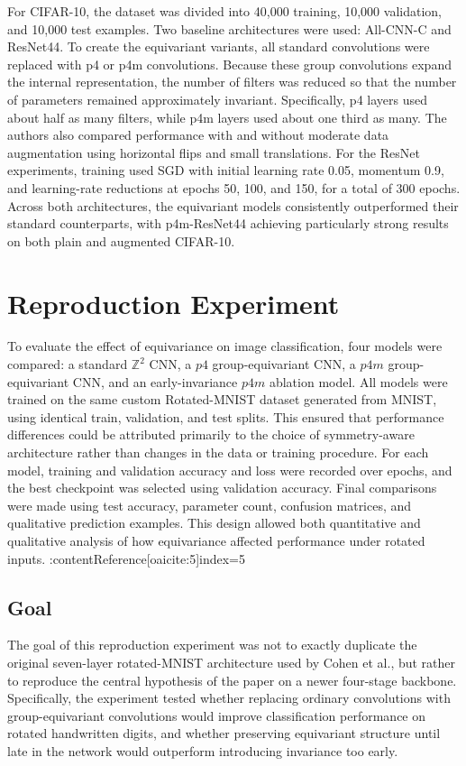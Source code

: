 \documentclass{article}
\begin{document}
For CIFAR-10, the dataset was divided into 40{,}000 training, 10{,}000 validation, and 10{,}000 test examples. Two baseline architectures were used: All-CNN-C and ResNet44. To create the equivariant variants, all standard convolutions were replaced with p4 or p4m convolutions. Because these group convolutions expand the internal representation, the number of filters was reduced so that the number of parameters remained approximately invariant. Specifically, p4 layers used about half as many filters, while p4m layers used about one third as many. The authors also compared performance with and without moderate data augmentation using horizontal flips and small translations. For the ResNet experiments, training used SGD with initial learning rate 0.05, momentum 0.9, and learning-rate reductions at epochs 50, 100, and 150, for a total of 300 epochs. Across both architectures, the equivariant models consistently outperformed their standard counterparts, with p4m-ResNet44 achieving particularly strong results on both plain and augmented CIFAR-10.

\section{Reproduction Experiment}

To evaluate the effect of equivariance on image classification, four models were compared: a standard \(\mathbb{Z}^2\) CNN, a \(p4\) group-equivariant CNN, a \(p4m\) group-equivariant CNN, and an early-invariance \(p4m\) ablation model. All models were trained on the same custom Rotated-MNIST dataset generated from MNIST, using identical train, validation, and test splits. This ensured that performance differences could be attributed primarily to the choice of symmetry-aware architecture rather than changes in the data or training procedure. For each model, training and validation accuracy and loss were recorded over epochs, and the best checkpoint was selected using validation accuracy. Final comparisons were made using test accuracy, parameter count, confusion matrices, and qualitative prediction examples. This design allowed both quantitative and qualitative analysis of how equivariance affected performance under rotated inputs. :contentReference[oaicite:5]{index=5}

\subsection{Goal}
The goal of this reproduction experiment was not to exactly duplicate the original seven-layer rotated-MNIST architecture used by Cohen et al., but rather to reproduce the central hypothesis of the paper on a newer four-stage backbone. Specifically, the experiment tested whether replacing ordinary convolutions with group-equivariant convolutions would improve classification performance on rotated handwritten digits, and whether preserving equivariant structure until late in the network would outperform introducing invariance too early.
\end{document}
